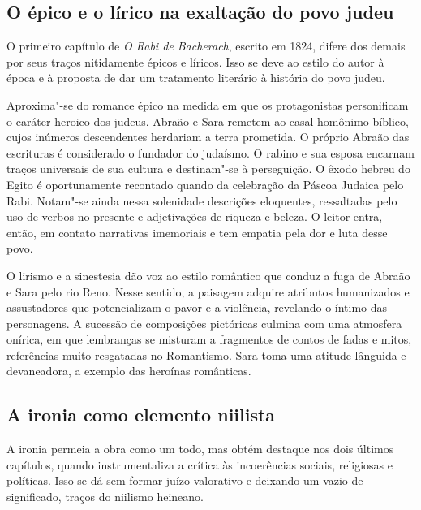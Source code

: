 \documentclass[12pt]{extarticle}
\begin{document}



\subsection{O épico e o lírico na exaltação do povo judeu}

O primeiro capítulo de \emph{O Rabi de Bacherach}, escrito em 1824, difere dos
demais por seus traços nitidamente épicos e líricos. Isso se deve ao
estilo do autor à época e à proposta de dar um tratamento literário à
história do povo judeu.

Aproxima"-se do romance épico na medida em que os protagonistas
personificam o caráter heroico dos judeus. Abraão e Sara remetem ao
casal homônimo bíblico, cujos inúmeros descendentes herdariam a terra
prometida. O próprio Abraão das escrituras é considerado o fundador do
judaísmo. O rabino e sua esposa encarnam traços universais de sua
cultura e destinam"-se à perseguição. O êxodo hebreu do Egito é
oportunamente recontado quando da celebração da Páscoa Judaica pelo
Rabi. Notam"-se ainda nessa solenidade descrições eloquentes, ressaltadas
pelo uso de verbos no presente e adjetivações de riqueza e beleza. O
leitor entra, então, em contato narrativas imemoriais e tem empatia pela
dor e luta desse povo.




O lirismo e a sinestesia dão voz ao estilo romântico que conduz a fuga
de Abraão e Sara pelo rio Reno. Nesse sentido, a paisagem adquire
atributos humanizados e assustadores que potencializam o pavor e a
violência, revelando o íntimo das personagens. A sucessão de composições
pictóricas culmina com uma atmosfera onírica, em que lembranças se
misturam a fragmentos de contos de fadas e mitos, referências muito
resgatadas no Romantismo. Sara toma uma atitude lânguida e devaneadora,
a exemplo das heroínas românticas.

\subsection{A ironia como elemento niilista}

A ironia permeia a obra como um todo, mas obtém destaque nos dois
últimos capítulos, quando instrumentaliza a crítica às incoerências
sociais, religiosas e políticas. Isso se dá sem formar juízo valorativo
e deixando um vazio de significado, traços do niilismo heineano.
\end{document}
